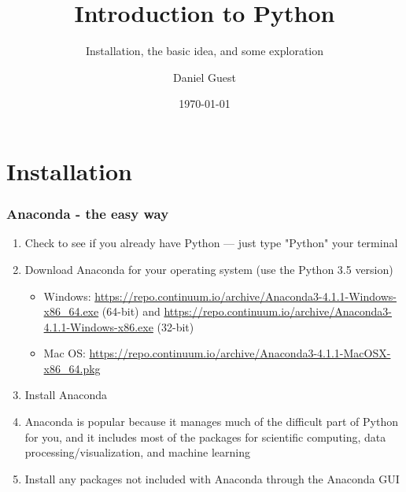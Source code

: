 \documentclass{beamer}
\title{Introduction to Python}
\subtitle{Installation, the basic idea, and some exploration}
\author{Daniel Guest}
\date{\today}
\begin{document}
\begin{frame}
	\titlepage
\end{frame}

\tableofcontents

\section{Installation}

\begin{frame}
\frametitle{Anaconda - the easy way}

\begin{enumerate}
	\item Check to see if you already have Python --- just type "Python" your terminal

	\item Download Anaconda for your operating system (use the Python 3.5 version)

	\begin{itemize}

		\item Windows: \url{https://repo.continuum.io/archive/Anaconda3-4.1.1-Windows-x86_64.exe} (64-bit) and \url{https://repo.continuum.io/archive/Anaconda3-4.1.1-Windows-x86.exe} (32-bit)
			
		\item Mac OS: \url{https://repo.continuum.io/archive/Anaconda3-4.1.1-MacOSX-x86_64.pkg}
	\end{itemize}
	\item Install Anaconda

	\item Anaconda is popular because it manages much of the difficult part of Python for you, and it includes most of the packages for scientific computing, data processing/visualization, and machine learning

	\item Install any packages not included with Anaconda through the Anaconda GUI
\end{enumerate}

\end{frame}
\end{document}
